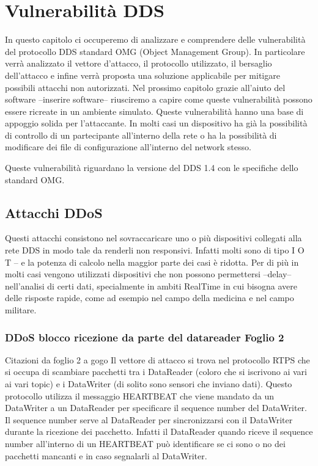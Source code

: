 \chapter{Vulnerabilità DDS}


In questo capitolo ci occuperemo di analizzare e comprendere delle vulnerabilità
del protocollo DDS standard OMG (Object Management Group). In particolare
verrà analizzato il vettore d'attacco, il protocollo utilizzato, il bersaglio
dell'attacco e infine verrà proposta una soluzione applicabile per
mitigare possibili attacchi non autorizzati. Nel prossimo capitolo grazie all'aiuto
del software --inserire software-- riusciremo a capire come queste vulnerabilità
possono essere ricreate in un ambiente simulato.
Queste vulnerabilità hanno una base di appoggio solida per 
l'attaccante. In molti casi un dispositivo ha già la possibilità di controllo
di un partecipante all'interno della rete o ha la possibilità di modificare
dei file di configurazione all'interno del network stesso.

Queste vulnerabilità riguardano la versione del DDS 1.4 con le specifiche 
dello standard OMG.




\section{Attacchi DDoS}
Questi attacchi consistono nel sovraccaricare uno o più dispositivi collegati alla 
rete DDS in modo tale da renderli non responsivi. Infatti molti sono di tipo 
I O T -- e la potenza di calcolo nella maggior parte dei casi è ridotta.
Per di più in molti casi vengono utilizzati dispositivi
che non possono permettersi --delay-- nell'analisi di certi dati, specialmente in
ambiti RealTime in cui bisogna avere delle risposte rapide, come ad esempio
nel campo della medicina e nel campo militare.


\subsection{DDoS blocco ricezione da parte del datareader Foglio 2}

Citazioni da foglio 2 a gogo
Il vettore di attacco si trova nel protocollo RTPS che
si occupa di scambiare pacchetti tra i DataReader (coloro che si iscrivono ai vari
ai vari topic) e i DataWriter (di solito sono sensori che inviano dati).
Questo protocollo utilizza il messaggio HEARTBEAT che viene mandato da un DataWriter
a un DataReader per specificare il sequence number del DataWriter.
Il sequence number serve al DataReader per sincronizzarsi con il DataWriter 
durante la ricezione dei pacchetto.
Infatti il DataReader quando riceve il sequence number all'interno di un HEARTBEAT
può identificare se ci sono o no dei pacchetti mancanti e in caso segnalarli al
DataWriter.\cite{White2017AnII}



